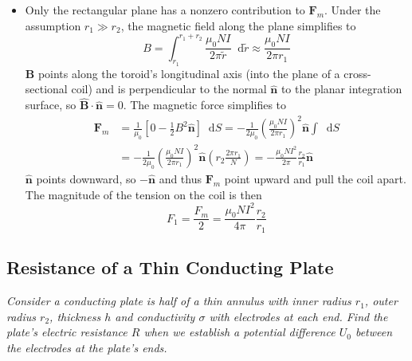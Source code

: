 \documentclass[11pt, a4paper]{article}
\newcommand{\diff}{\mathop{}\!\mathrm{d}} %
\renewcommand{\vec}[1]{\bm{#1}} %
\newcommand{\uvec}[1]{\hat{\vec{#1}}} %
\begin{document}
\begin{itemize}
	\item Only the rectangular plane has a nonzero contribution to $ \vec{F}_{m} $. Under the assumption $ r_{1} \gg r_{2} $, the magnetic field along the plane simplifies to
	\begin{equation*}
		B = \int_{r_{1}}^{r_{1} + r_{2}} \frac{\mu_{0}NI}{2\pi \tilde{r}} \diff \tilde{r} \approx \frac{\mu_{0}NI}{2\pi r_{1}}
	\end{equation*}
	$ \vec{B} $ points along the toroid's longitudinal axis (into the plane of a cross-sectional coil) and is perpendicular to the normal $ \uvec{n} $ to the planar integration surface, so $ \uvec{B} \cdot \uvec{n} = 0 $. The magnetic force simplifies to
	\begin{align*}
		\vec{F}_{m} &= \frac{1}{\mu_{0}}\left [0 - \frac{1}{2}B^{2}\uvec{n}\right ] \diff S = - \frac{1}{2\mu_{0}} \left(\frac{\mu_{0}NI}{2\pi r_{1}}\right)^{2} \uvec{n} \int \diff S \\
		&= - \frac{1}{2\mu_{0}} \left(\frac{\mu_{0}NI}{2\pi r_{1}}\right)^{2} \uvec{n} \left (r_{2} \frac{2\pi r_{1}}{N}\right ) = - \frac{\mu_{0}NI^{2}}{2\pi}\frac{r_{2}}{r_{1}} \uvec{n}
	\end{align*}
	$ \uvec{n} $ points downward, so $ -\uvec{n} $ and thus $ \vec{F}_{m} $ point upward and pull the coil apart. The magnitude of the tension on the coil is then
	\begin{equation*}
		F_{1} = \frac{F_{m}}{2} =  \frac{\mu_{0}NI^{2}}{4\pi}\frac{r_{2}}{r_{1}}
	\end{equation*}
	
\end{itemize}

\subsection{Resistance of a Thin Conducting Plate}
\textit{Consider a conducting plate is half of a thin annulus with inner radius $ r_{1} $, outer radius $ r_{2} $, thickness $ h $ and conductivity $ \sigma $ with electrodes at each end.  Find the plate's electric resistance $ R $ when we establish a potential difference $ U_{0}$ between the electrodes at the plate's ends.}
\end{document}
